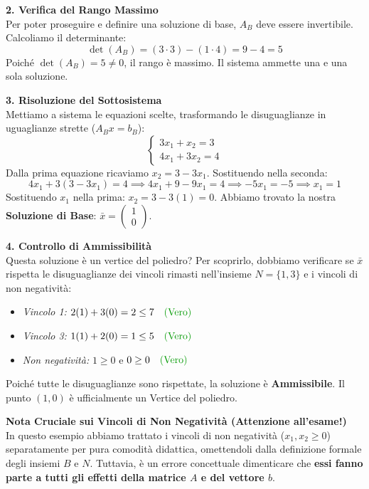 \documentclass[12pt, a4paper]{article}
\begin{document}
	\textbf{2. Verifica del Rango Massimo}\\
	Per poter proseguire e definire una soluzione di base, $A_B$ deve essere invertibile. Calcoliamo il determinante:
	\[
	\det(A_B) = (3 \cdot 3) - (1 \cdot 4) = 9 - 4 = 5
	\]
	Poiché $\det(A_B) = 5 \neq 0$, il rango è massimo. Il sistema ammette una e una sola soluzione.
	
	\vspace{0.3cm}
	\textbf{3. Risoluzione del Sottosistema}\\
	Mettiamo a sistema le equazioni scelte, trasformando le disuguaglianze in uguaglianze strette ($A_B x = b_B$):
	\[
	\begin{cases}
		3x_1 + x_2 = 3 \\
		4x_1 + 3x_2 = 4
	\end{cases}
	\]
	Dalla prima equazione ricaviamo $x_2 = 3 - 3x_1$. Sostituendo nella seconda:
	\[
	4x_1 + 3(3 - 3x_1) = 4 \implies 4x_1 + 9 - 9x_1 = 4 \implies -5x_1 = -5 \implies x_1 = 1
	\]
	Sostituendo $x_1$ nella prima: $x_2 = 3 - 3(1) = 0$.
	Abbiamo trovato la nostra \textbf{Soluzione di Base}: $\bar{x} = \begin{pmatrix} 1 \\ 0 \end{pmatrix}$.
	
	\vspace{0.3cm}
	\textbf{4. Controllo di Ammissibilità}\\
	Questa soluzione è un vertice del poliedro? Per scoprirlo, dobbiamo verificare se $\bar{x}$ rispetta le disuguaglianze dei vincoli rimasti nell'insieme $N = \{1, 3\}$ e i vincoli di non negatività:
	\begin{itemize}
		\item \textit{Vincolo 1:} $2(1) + 3(0) = 2 \leq 7 \quad \text{\textcolor{green!60!black}{(Vero)}}$
		\item \textit{Vincolo 3:} $1(1) + 2(0) = 1 \leq 5 \quad \text{\textcolor{green!60!black}{(Vero)}}$
		\item \textit{Non negatività:} $1 \geq 0$ e $0 \geq 0 \quad \text{\textcolor{green!60!black}{(Vero)}}$
	\end{itemize}
	Poiché tutte le disuguaglianze sono rispettate, la soluzione è \textbf{Ammissibile}. Il punto $(1,0)$ è ufficialmente un Vertice del poliedro.
	
	\vspace{0.4cm}
	\textbf{Nota Cruciale sui Vincoli di Non Negatività (Attenzione all'esame!)}\\
	In questo esempio abbiamo trattato i vincoli di non negatività ($x_1, x_2 \geq 0$) separatamente per pura comodità didattica, omettendoli dalla definizione formale degli insiemi $B$ e $N$. Tuttavia, è un errore concettuale dimenticare che \textbf{essi fanno parte a tutti gli effetti della matrice $A$ e del vettore $b$}. 
	
\end{document}
